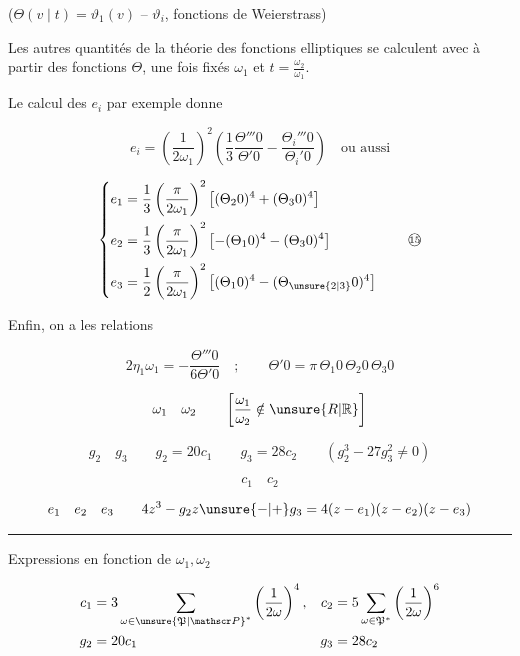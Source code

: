 ($\Theta(v\mid t)=\vartheta_1(v)$ \quad -- $\vartheta_i$, fonctions de Weierstrass)

Les autres quantités de la théorie des fonctions elliptiques se calculent avec  à partir des fonctions $\Theta$, une fois fixés $\omega_1$ et $t=\frac{\omega_2}{\omega_1}$.

Le calcul des $e_i$ par exemple donne

\[
e_i=\left(\frac1{2\omega_1}\right)^2
\left(\frac13\frac{\Theta'''0}{\Theta'0}-\frac{\Theta_i'''0}{\Theta_i'0}\right)
\quad\text{ou aussi}
\]

\[
\left\{\begin{aligned}
e_1&=\frac13\left(\frac{\pi}{2\omega_1}\right)^2\left[(\Theta_2 0)^4+(\Theta_3 0)^4\right]\\
e_2&=\frac13\left(\frac{\pi}{2\omega_1}\right)^2\left[-(\Theta_1 0)^4-(\Theta_3 0)^4\right]\\
e_3&=\frac12\left(\frac{\pi}{2\omega_1}\right)^2\left[(\Theta_1 0)^4-(\Theta_{\unsure{2|3}}0)^4\right]
\end{aligned}\right.
\tag*{\textcircled{\scriptsize 15}}
\]

Enfin, on a les relations

\[
2\eta_1\omega_1=-\frac{\Theta'''0}{6\Theta'0}\quad;\qquad
\Theta'0=\pi\,\Theta_1 0\,\Theta_2 0\,\Theta_3 0
\]

\[
\omega_1\quad\omega_2\qquad\left[\frac{\omega_1}{\omega_2}\notin\unsure{R|\mathbb R}\right]
\]

\[
g_2\quad g_3\qquad\boxed{g_2=20c_1\qquad g_3=28c_2}\qquad(g_2^3-27g_3^2\ne0)
\]

\[c_1\quad c_2\]

\[
e_1\quad e_2\quad e_3\qquad 4z^3-g_2z\unsure{-|+}g_3=4(z-e_1)(z-e_2)(z-e_3)
\]

\noindent\rule{.4\linewidth}{.4pt}

Expressions en fonction de $\omega_1,\omega_2$

\[
\begin{aligned}
c_1&=3\sum_{\omega\in{\unsure{\mathfrak P|\mathscr P}}^{*}}\left(\frac1{2\omega}\right)^4,&
c_2&=5\sum_{\omega\in\mathfrak P^{*}}\left(\frac1{2\omega}\right)^6\\
g_2&=20c_1&g_3&=28c_2
\end{aligned}
\]


